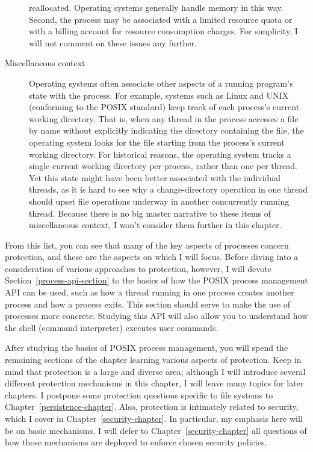 \begin{description}
reallocated.  Operating systems generally handle memory
in this way.  Second, the process may be associated with a
limited resource quota or with a billing account for resource
consumption charges.  For simplicity, I will not comment on these
issues any further.
\item[Miscellaneous context] Operating systems often associate other
aspects of a running program's state with the process.  For example,
systems such as Linux and UNIX (conforming to the POSIX standard) keep
track of each process's current working directory.  That is, when any
thread in the process accesses a file by name without
explicitly indicating the directory containing the file,
the operating system looks for the file starting from the process's
current working directory.  For historical reasons, the operating
system tracks a single current working
directory per process, rather than one per thread.  Yet this state
might have been better associated with the individual threads, as it
is hard to see why a change-directory operation in one thread should upset file
operations underway in another concurrently running thread.  Because there is no
big master narrative to these items of miscellaneous context, I won't consider
them further in this chapter.
\end{description}

From this list, you can see that many of the key aspects of processes
concern protection, and these are the aspects on which I will focus.
Before diving into a consideration of various approaches to
protection, however, I will devote Section~\ref{process-api-section}
to the basics of how the POSIX process management API can be used,
such as how a thread running in one process
creates another process and how a process exits.  This section should
serve to make the use of processes more concrete.  Studying this API
will also allow you to
understand how the shell (command interpreter)
executes user commands.

After studying the basics of POSIX process management, you will spend
the remaining sections of the chapter learning various aspects of
protection.  Keep in mind that protection is a large and diverse area;
although I will introduce several different protection mechanisms in
this chapter, I will leave many topics for later chapters.  I
postpone some protection questions specific to file
systems to Chapter~\ref{persistence-chapter}.
Also, protection is intimately related to security, which I
cover in  Chapter~\ref{security-chapter}.  In particular, my emphasis
here will be on basic mechanisms.
I will defer to  Chapter~\ref{security-chapter} all questions of how
those mechanisms are deployed to enforce chosen security policies.

